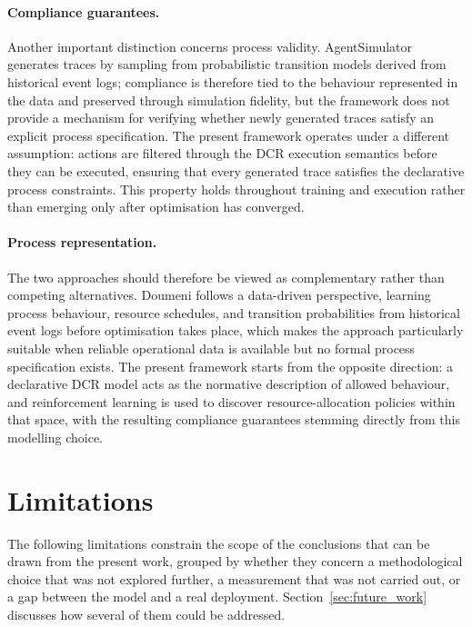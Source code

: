 \paragraph{Compliance guarantees.} Another important distinction concerns process validity. AgentSimulator generates traces by sampling from probabilistic transition models derived from historical event logs; compliance is therefore tied to the behaviour represented in the data and preserved through simulation fidelity, but the framework does not provide a mechanism for verifying whether newly generated traces satisfy an explicit process specification. The present framework operates under a different assumption: actions are filtered through the \ac{DCR} execution semantics before they can be executed, ensuring that every generated trace satisfies the declarative process constraints. This property holds throughout training and execution rather than emerging only after optimisation has converged.

\paragraph{Process representation.} The two approaches should therefore be viewed as complementary rather than competing alternatives. Doumeni follows a data-driven perspective, learning process behaviour, resource schedules, and transition probabilities from historical event logs before optimisation takes place, which makes the approach particularly suitable when reliable operational data is available but no formal process specification exists. The present framework starts from the opposite direction: a declarative \ac{DCR} model acts as the normative description of allowed behaviour, and reinforcement learning is used to discover resource-allocation policies within that space, with the resulting compliance guarantees stemming directly from this modelling choice.

\section{Limitations}
\label{sec:limitations}

The following limitations constrain the scope of the conclusions that can be drawn from the present work, grouped by whether they concern a methodological choice that was not explored further, a measurement that was not carried out, or a gap between the model and a real deployment. Section~\ref{sec:future_work} discusses how several of them could be addressed.

